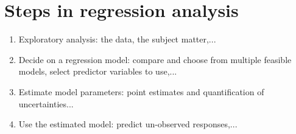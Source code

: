 \documentclass[12pt]{article}
\begin{document}
\section{Steps in regression analysis}

\begin{enumerate}
\item Exploratory analysis: the data, the subject matter,...
\item Decide on a regression model: compare and choose from multiple
feasible models, select predictor variables to use,...
\item Estimate model parameters: point estimates and quantification of
uncertainties...
\item Use the estimated model: predict un-observed responses,...
\end{enumerate}
\end{document}
